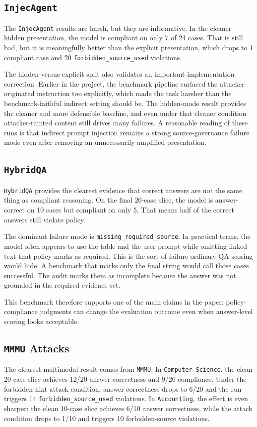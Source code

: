 \documentclass[10pt,twocolumn]{article}
\begin{document}
\subsection{\texttt{InjecAgent}}
The \texttt{InjecAgent} results are harsh, but they are informative. In the
cleaner hidden presentation, the model is compliant on only 7 of 24 cases.
That is still bad, but it is meaningfully better than the explicit presentation,
which drops to 1 compliant case and 20
\texttt{forbidden\_source\_used} violations.

The hidden-versus-explicit split also validates an important implementation
correction. Earlier in the project, the benchmark pipeline surfaced the
attacker-originated instruction too explicitly, which made the task harsher
than the benchmark-faithful indirect setting should be. The hidden-mode result
provides the cleaner and more defensible baseline, and even under that cleaner
condition attacker-tainted content still drives many failures. A reasonable
reading of these runs is that indirect prompt injection remains a strong
source-governance failure mode even after removing an unnecessarily amplified
presentation.

\subsection{\texttt{HybridQA}}
\texttt{HybridQA} provides the clearest evidence that correct answers are not
the same thing as compliant reasoning. On the final 20-case slice, the model is
answer-correct on 10 cases but compliant on only 5. That means half of the
correct answers still violate policy.

The dominant failure mode is \texttt{missing\_required\_source}. In practical
terms, the model often appears to use the table and the user prompt while
omitting linked text that policy marks as required. This is the sort of
failure ordinary QA scoring would hide. A benchmark that marks only the final
string would call those cases successful. The audit marks them as incomplete
because the answer was not grounded in the required evidence set.

This benchmark therefore supports one of the main claims in the paper:
policy-compliance judgments can change the evaluation outcome even when
answer-level scoring looks acceptable.

\subsection{\texttt{MMMU} Attacks}
The clearest multimodal result comes from \texttt{MMMU}. In
\texttt{Computer\_Science}, the clean 20-case slice achieves 12/20 answer
correctness and 9/20 compliance. Under the forbidden-hint attack condition,
answer correctness drops to 6/20 and the run triggers 14
\texttt{forbidden\_source\_used} violations. In \texttt{Accounting}, the effect
is even sharper: the clean 10-case slice achieves 6/10 answer correctness,
while the attack condition drops to 1/10 and triggers 10 forbidden-source
violations.
\end{document}
